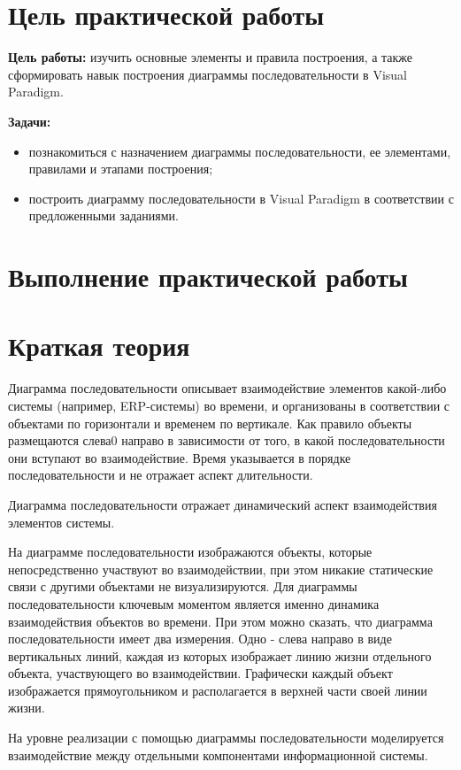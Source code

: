 \graphicspath{{./ThirdTask/}} %

\section*{\LARGE Цель практической работы}

\textbf{Цель работы:} изучить основные элементы и правила построения, а также
сформировать навык построения диаграммы последовательности в Visual
Paradigm.

\textbf{Задачи:}\par
\begin{itemize}
	\item познакомиться с назначением диаграммы последовательности, ее
		элементами, правилами и этапами построения;
	\item построить диаграмму последовательности в Visual Paradigm в
		соответствии с предложенными заданиями.
\end{itemize}

\newpage

\section*{\LARGE Выполнение практической работы}
\section{Краткая теория}
Диаграмма последовательности описывает взаимодействие элементов
какой-либо системы (например, ERP-системы) во времени, и организованы в
соответствии с объектами по горизонтали и временем по вертикале. Как
правило объекты размещаются слева0 направо в зависимости от того, в какой
последовательности они вступают во взаимодействие. Время указывается в
порядке последовательности и не отражает аспект длительности.\par
Диаграмма последовательности отражает динамический аспект
взаимодействия элементов системы.\par
На диаграмме последовательности изображаются объекты, которые
непосредственно участвуют во взаимодействии, при этом никакие статические
связи с другими объектами не визуализируются. Для диаграммы
последовательности ключевым моментом является именно динамика
взаимодействия объектов во времени. При этом можно сказать, что диаграмма
последовательности имеет два измерения. Одно - слева направо в виде
вертикальных линий, каждая из которых изображает линию жизни отдельного
объекта, участвующего во взаимодействии. Графически каждый объект
изображается прямоугольником и располагается в верхней части своей линии
жизни.\par
На уровне реализации с помощью диаграммы последовательности моделируется
взаимодействие между отдельными компонентами информационной системы.

